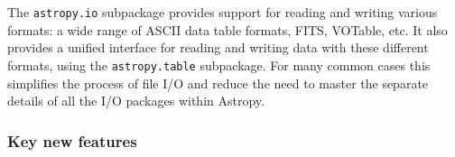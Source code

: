 \documentclass[modern]{aastex61}
\newcommand{\package}[1]{\texttt{#1}\xspace}
\newcommand{\inlinecomment}[2]{\todo[inline]{#1: #2}\xspace}
\begin{document}
The \package{astropy.io} subpackage provides support for reading and writing
various formats: a wide range of ASCII data table formats, FITS, VOTable, etc.
It also provides a unified interface for reading and writing data with these
different formats, using the \package{astropy.table} subpackage.
For many common cases this simplifies the process of file I/O and reduce the
need to master the separate details of all the I/O packages within Astropy.




\subsubsection{Key new features}
\end{document}
